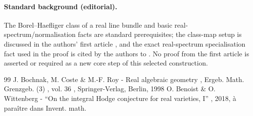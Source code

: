 \documentclass[11pt]{article}
\begin{document}
\paragraph{Standard background (editorial).}
The Borel--Haefliger class of a real line bundle and basic real-spectrum/normalisation facts are standard prerequisites; the class-map setup is discussed in the authors' first article \cite{BW1}, and the exact real-spectrum specialisation fact used in the proof is cited by the authors to \cite[Prop.\,7.1.21]{bcr}. No proof from the first article is asserted or required as a new core step of this selected construction.
\setcounter{section}{9}\setcounter{subsection}{3}\setcounter{subsubsection}{0}\setcounter{thm}{14}

\setcounter{thm}{16}\setcounter{equation}{3}

\begin{thebibliography}{99}
 J. Bochnak, M. Coste \& M.-F. Roy - Real algebraic geometry , Ergeb. Math. Grenzgeb. (3) , vol. 36 , Springer-Verlag, Berlin, 1998
 O. Benoist \& O. Wittenberg - “On the integral Hodge conjecture for real varieties, I” , 2018, à paraître dans Invent. math.
\end{thebibliography}
\end{document}
